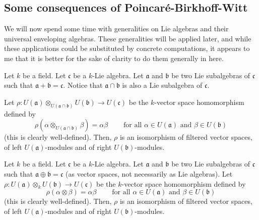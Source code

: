 \documentclass[etingof-lie.tex]{subfiles}
\begin{document}
\subsection{Some consequences of Poincar\'{e}-Birkhoff-Witt}

We will now spend some time with generalities on Lie algebras and their
universal enveloping algebras. These generalities will be applied later, and
while these applications could be substituted by concrete computations, it
appears to me that it is better for the sake of clarity to do them generally
in here.

\begin{proposition}
\label{prop.U(X)U}Let $k$ be a field. Let $\mathfrak{c}$ be a $k$-Lie algebra.
Let $\mathfrak{a}$ and $\mathfrak{b}$ be two Lie subalgebras of $\mathfrak{c}$
such that $\mathfrak{a}+\mathfrak{b}=\mathfrak{c}$. Notice that $\mathfrak{a}%
\cap\mathfrak{b}$ is also a Lie subalgebra of $\mathfrak{c}$.

Let $\rho:U\left(  \mathfrak{a}\right)  \otimes_{U\left(  \mathfrak{a}%
\cap\mathfrak{b}\right)  }U\left(  \mathfrak{b}\right)  \rightarrow U\left(
\mathfrak{c}\right)  $ be the $k$-vector space homomorphism defined by%
\[
\rho\left(  \alpha\otimes_{U\left(  \mathfrak{a}\cap\mathfrak{b}\right)
}\beta\right)  =\alpha\beta\ \ \ \ \ \ \ \ \ \ \text{for all }\alpha\in
U\left(  \mathfrak{a}\right)  \text{ and }\beta\in U\left(  \mathfrak{b}%
\right)
\]
(this is clearly well-defined). Then, $\rho$ is an isomorphism of filtered
vector spaces, of left $U\left(  \mathfrak{a}\right)  $-modules and of right
$U\left(  \mathfrak{b}\right)  $-modules.
\end{proposition}

\begin{corollary}
\label{cor.U(X)U}Let $k$ be a field. Let $\mathfrak{c}$ be a $k$-Lie algebra.
Let $\mathfrak{a}$ and $\mathfrak{b}$ be two Lie subalgebras of $\mathfrak{c}$
such that $\mathfrak{a}\oplus\mathfrak{b}=\mathfrak{c}$ (as vector spaces, not
necessarily as Lie algebras). Let $\rho:U\left(  \mathfrak{a}\right)
\otimes_{k}U\left(  \mathfrak{b}\right)  \rightarrow U\left(  \mathfrak{c}%
\right)  $ be the $k$-vector space homomorphism defined by%
\[
\rho\left(  \alpha\otimes\beta\right)  =\alpha\beta
\ \ \ \ \ \ \ \ \ \ \text{for all }\alpha\in U\left(  \mathfrak{a}\right)
\text{ and }\beta\in U\left(  \mathfrak{b}\right)
\]
(this is clearly well-defined). Then, $\rho$ is an isomorphism of filtered
vector spaces, of left $U\left(  \mathfrak{a}\right)  $-modules and of right
$U\left(  \mathfrak{b}\right)  $-modules.
\end{corollary}
\end{document}
